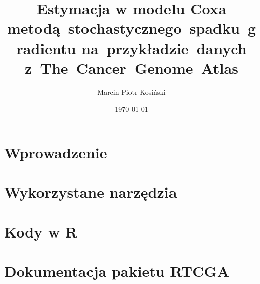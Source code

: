 \documentclass{mini}
\title{Estymacja w modelu Coxa metodą~stochastycznego~spadku~gradientu na~przykładzie~danych z~The~Cancer~Genome~Atlas}
\author{Marcin Piotr Kosiński}
\date{\today}
\begin{document}
\maketitle
\tableofcontents

\chapter*{Wprowadzenie}











\appendix

\chapter{Wykorzystane narzędzia}
\chapter{Kody w R}
\chapter{Dokumentacja pakietu RTCGA}





\makestatement
\end{document}
